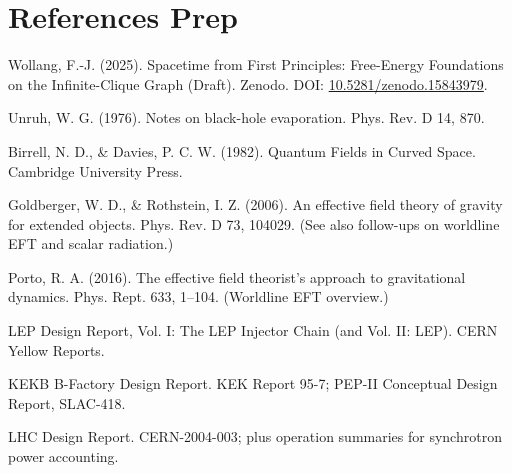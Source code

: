 \documentclass[11pt]{article}
\begin{document}
\section*{References Prep}
\noindent Wollang, F.-J. (2025). Spacetime from First Principles: Free-Energy Foundations on the Infinite-Clique Graph (Draft). Zenodo. DOI: \href{https://doi.org/10.5281/zenodo.15843979}{10.5281/zenodo.15843979}.

\medskip
\noindent Unruh, W. G. (1976). Notes on black-hole evaporation. Phys. Rev. D 14, 870.

\noindent Birrell, N. D., \& Davies, P. C. W. (1982). Quantum Fields in Curved Space. Cambridge University Press.

\noindent Goldberger, W. D., \& Rothstein, I. Z. (2006). An effective field theory of gravity for extended objects. Phys. Rev. D 73, 104029. (See also follow-ups on worldline EFT and scalar radiation.)

\noindent Porto, R. A. (2016). The effective field theorist’s approach to gravitational dynamics. Phys. Rept. 633, 1–104. (Worldline EFT overview.)

\noindent LEP Design Report, Vol. I: The LEP Injector Chain (and Vol. II: LEP). CERN Yellow Reports.

\noindent KEKB B-Factory Design Report. KEK Report 95-7; PEP-II Conceptual Design Report, SLAC-418.

\noindent LHC Design Report. CERN-2004-003; plus operation summaries for synchrotron power accounting.

\medskip

\appendix

\end{document}
